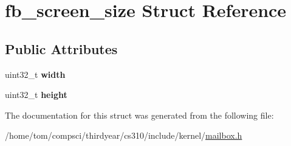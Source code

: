 \hypertarget{structfb__screen__size}{}\section{fb\+\_\+screen\+\_\+size Struct Reference}
\label{structfb__screen__size}
\subsection*{Public Attributes}
\begin{DoxyCompactItemize}
\item 
\mbox{\label{structfb__screen__size_ad3682d51fe1193c451624c085f67111f}} 
uint32\+\_\+t {\bfseries width}
\item 
\mbox{\label{structfb__screen__size_a33ee0c5889e1402800ad8fbc9fd5efa4}} 
uint32\+\_\+t {\bfseries height}
\end{DoxyCompactItemize}


The documentation for this struct was generated from the following file\+:\begin{DoxyCompactItemize}
\item 
/home/tom/compsci/thirdyear/cs310/include/kernel/\mbox{\hyperlink{mailbox_8h}{mailbox.\+h}}\end{DoxyCompactItemize}
